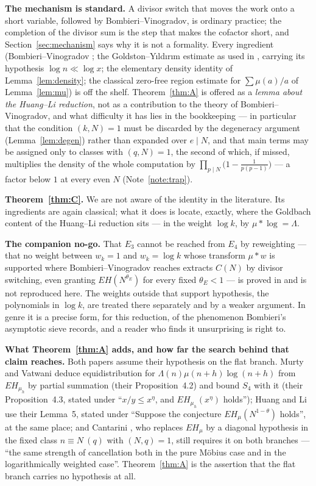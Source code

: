 \documentclass[11pt,a4paper]{article}
\theoremstyle{plain}
\theoremstyle{definition}
\theoremstyle{remark}
\begin{document}
\medskip\noindent
\textbf{The mechanism is standard.} A divisor switch that moves the
work onto a short variable, followed by Bombieri--Vinogradov, is
ordinary practice; the completion of the divisor sum is the step that
makes the cofactor short, and Section~\ref{sec:mechanism} says why it
is not a formality. Every ingredient (Bombieri--Vinogradov \cite{MoV2};
the Goldston--Y{\i}ld{\i}r{\i}m estimate \cite{GY} as used in
\cite{HL}, carrying its hypothesis $\log n\ll\log x$; the elementary
density identity of Lemma~\ref{lem:density}; the classical zero-free
region estimate for $\sum\mu(a)/a$ of Lemma~\ref{lem:mu}) is off the
shelf. Theorem~\ref{thm:A} is offered as a \emph{lemma about the
Huang--Li reduction}, not as a contribution to the theory of
Bombieri--Vinogradov, and what difficulty it has lies in the
bookkeeping --- in particular that the condition $(k,N)=1$ must be
discarded by the degeneracy argument (Lemma~\ref{lem:degen}) rather
than expanded over $e\mid N$, and that main terms may be assigned only
to classes with $(q,N)=1$, the second of which, if missed, multiplies
the density of the whole computation by
$\prod_{p\mid N}\bigl(1-\tfrac{1}{p(p-1)}\bigr)$ --- a factor below $1$
at every even $N$ (Note~\ref{note:trap}).

\medskip\noindent
\textbf{Theorem~\ref{thm:C}.} We are not aware of the identity in the
literature. Its ingredients are again classical; what it does is
locate, exactly, where the Goldbach content of the Huang--Li reduction
sits --- in the weight $\log k$, by $\mu*\log=\Lambda$.

\medskip\noindent
\textbf{The companion no-go.} That $E_3$ cannot be reached from $E_4$
by reweighting --- that no weight between $w_k=1$ and $w_k=\log k$
whose transform $\mu*w$ is supported where
Bombieri--Vinogradov reaches extracts $C(N)$ by divisor switching,
even granting $EH(N^{\theta_E})$ for every fixed $\theta_E<1$ --- is
proved in \cite{P2} and is not reproduced here. The weights outside
that support hypothesis, the polynomials in $\log k$, are treated
there separately and by a weaker argument. In genre it is a precise
form, for this reduction, of the phenomenon Bombieri's asymptotic
sieve \cite{Bom76} records, and a reader who finds it unsurprising is
right to.

\medskip\noindent
\textbf{What Theorem~\ref{thm:A} adds, and how far the search behind
that claim reaches.} Both papers assume their hypothesis on the flat
branch. Murty and Vatwani \cite{MV17} deduce equidistribution for
$\Lambda(n)\mu(n+h)\log(n+h)$ from $EH_{\mu_h}$ by partial summation
(their Proposition~4.2) and bound $S_4$ with it (their
Proposition~4.3, stated under ``$x/y\le x^{\eta}$, and
$EH_{\mu_h}(x^{\eta})$ holds''); Huang and Li \cite{HL} use their
Lemma~5, stated under ``Suppose the conjecture $EH_\mu(N^{1-\theta})$
holds'', at the same place; and Cantarini \cite{Can}, who replaces
$EH_\mu$ by a diagonal hypothesis in the fixed class
$n\equiv N\ (q)$ with $(N,q)=1$, still requires it on both branches ---
``the same strength of cancellation both in the pure M\"obius case and
in the logarithmically weighted case''. Theorem~\ref{thm:A} is the
assertion that the flat branch carries no hypothesis at all.
\end{document}
